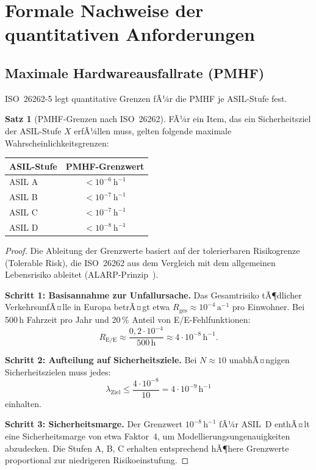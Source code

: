 ﻿\documentclass[a4paper,12pt]{article}
\theoremstyle{definition}
\newtheorem{satz}{Satz}
\begin{document}
\section{Formale Nachweise der quantitativen Anforderungen}

\subsection{Maximale Hardwareausfallrate (PMHF)}

ISO~26262-5 legt quantitative Grenzen fÃ¼r die PMHF je ASIL-Stufe fest.

\begin{satz}[PMHF-Grenzen nach ISO~26262]
\label{satz:pmhf}
  FÃ¼r ein Item, das ein Sicherheitsziel der ASIL-Stufe $X$ erfÃ¼llen
  muss, gelten folgende maximale Wahrscheinlichkeitsgrenzen:
  \begin{center}
    \begin{tabular}{lc}
      \toprule
      ASIL-Stufe & PMHF-Grenzwert\\
      \midrule
      ASIL A & $< 10^{-6}\,\mathrm{h}^{-1}$\\
      ASIL B & $< 10^{-7}\,\mathrm{h}^{-1}$\\
      ASIL C & $< 10^{-7}\,\mathrm{h}^{-1}$\\
      ASIL D & $< 10^{-8}\,\mathrm{h}^{-1}$\\
      \bottomrule
    \end{tabular}
  \end{center}
\end{satz}

\begin{proof}
  Die Ableitung der Grenzwerte basiert auf der tolerierbaren
  Risikogrenze (Tolerable Risk), die ISO~26262 aus dem Vergleich mit
  dem allgemeinen Lebensrisiko ableitet (ALARP-Prinzip~\cite{health_safety_1992}).

  \textbf{Schritt 1: Basisannahme zur Unfallursache.}
  Das Gesamtrisiko tÃ¶dlicher VerkehrsunfÃ¤lle in Europa betrÃ¤gt etwa
  $R_{\mathrm{ges}} \approx 10^{-4}\,\mathrm{a}^{-1}$ pro Einwohner.
  Bei 500\,h Fahrzeit pro Jahr und 20\,\% Anteil von
  E/E-Fehlfunktionen:
  \[
    R_{\mathrm{E/E}}
    \approx \frac{0{,}2 \cdot 10^{-4}}{500\,\mathrm{h}}
    \approx 4 \cdot 10^{-8}\,\mathrm{h}^{-1}.
  \]

  \textbf{Schritt 2: Aufteilung auf Sicherheitsziele.}
  Bei $N \approx 10$ unabhÃ¤ngigen Sicherheitszielen muss jedes:
  \[
    \lambda_{\mathrm{Ziel}}
    \leq \frac{4 \cdot 10^{-8}}{10}
    = 4 \cdot 10^{-9}\,\mathrm{h}^{-1}
  \]
  einhalten.

  \textbf{Schritt 3: Sicherheitsmarge.}
  Der Grenzwert $10^{-8}\,\mathrm{h}^{-1}$ fÃ¼r ASIL~D enthÃ¤lt eine
  Sicherheitsmarge von etwa Faktor~4, um Modellierungsungenauigkeiten
  abzudecken. Die Stufen A, B, C erhalten entsprechend hÃ¶here
  Grenzwerte proportional zur niedrigeren Risikoeinstufung.
\end{proof}
\end{document}
